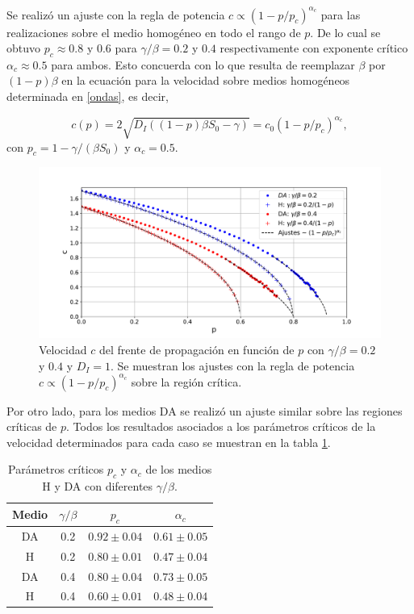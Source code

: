 Se realizó un ajuste con la regla de potencia $c\propto(1-p/p_c)^{\alpha_c}$ para las realizaciones sobre el medio homogéneo en todo el rango de $p$. De lo cual se 
obtuvo $p_c \approx 0.8$ y $0.6$ para $\gamma/\beta=0.2$ y $0.4$ respectivamente con exponente crítico $\alpha_c \approx 0.5$ para ambos. Esto concuerda con lo que 
resulta de reemplazar $\beta$ por $(1-p)\beta$ en la ecuación para la velocidad sobre medios homogéneos determinada en \ref{ondas}, es decir,

\[c(p) = 2\sqrt{D_I((1-p)\beta S_0-\gamma)} = c_0(1-p/p_c)^{\alpha_c},\]
con $p_c=1-\gamma/(\beta S_0)$ y $\alpha_c=0.5$. 


\begin{figure}[h]
    \centering
    \includegraphics[width=\imsizeL]{velocidad_p.pdf}
    \caption{Velocidad $c$ del frente de propagación en función de $p$ con $\gamma/\beta=0.2$ y $0.4$ y $D_{I}=1$. Se muestran los 
    ajustes con la regla de potencia $c\propto(1-p/p_c)^{\alpha_c}$ sobre la región crítica.}
    \label{fig:velocidad_p}
\end{figure}

Por otro lado, para los medios DA se realizó un ajuste similar sobre las regiones críticas  de $p$. Todos los resultados asociados a los parámetros críticos de 
la velocidad determinados para cada caso se muestran en la tabla \ref{tab:param_criticos}. 

\begin{table}[]
    \centering
    \caption{Parámetros críticos $p_c$ y $\alpha_c$ de los medios H y DA con diferentes $\gamma/\beta$.}
    \label{tab:param_criticos}
    \begin{tabular}{@{}cccc@{}}
    \toprule
    Medio & $\gamma/\beta$ & $p_c$         & $\alpha_c$    \\ \midrule
    DA    & 0.2            & $0.92\pm0.04$ & $0.61\pm0.05$ \\
    H     & 0.2            & $0.80\pm0.01$ & $0.47\pm0.04$ \\
    DA    & 0.4            & $0.80\pm0.04$ & $0.73\pm0.05$ \\
    H     & 0.4            & $0.60\pm0.01$ & $0.48\pm0.04$ \\ \bottomrule
    \end{tabular}
\end{table}

